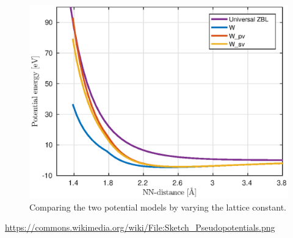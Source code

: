 \documentclass{article}
\begin{document}

\begin{figure}[H]
  \centering
  \includegraphics[scale=0.82]{img/pot-comp-compr2.eps}
  \caption{Comparing the two potential models by varying the lattice constant.}
  \label{fig:compr-comp}
\end{figure}

\begin{thebibliography}{100}
 \url{https://commons.wikimedia.org/wiki/File:Sketch_Pseudopotentials.png}
\end{thebibliography}
\end{document}
